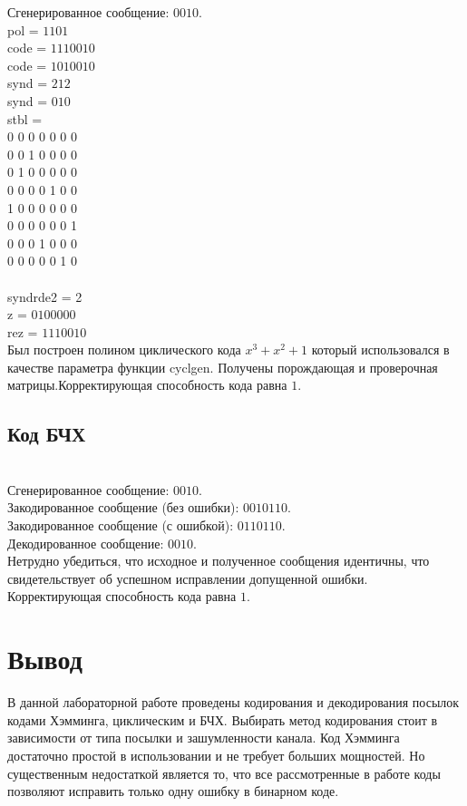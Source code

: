 \documentclass[a4paper]{article}
\begin{document}
Сгенерированное сообщение: $0 0 1 0$.\\
pol = $1 1 0 1$\\
code = $1 1 1 0 0 1 0$\\
code = $1 0 1 0 0 1 0$\\
synd = $2 1 2$\\
synd = $0 1 0$\\
stbl =\\
	 0     0     0     0     0     0     0\\
     0     0     1     0     0     0     0\\
     0     1     0     0     0     0     0\\
     0     0     0     0     1     0     0\\
     1     0     0     0     0     0     0\\
     0     0     0     0     0     0     1\\
     0     0     0     1     0     0     0\\
     0     0     0     0     0     1     0\\
\\
syndrde2 = 2\\
z = $0 1 0 0 0 0 0$\\
rez = $1 1 1 0 0 1 0$\\
Был построен полином циклического кода $x^3 + x^2 + 1$
который использовался в качестве параметра функции cyclgen. Получены порождающая и проверочная матрицы.Корректирующая способность кода равна $1$.
\subsection{Код БЧХ}
\\

Сгенерированное сообщение: $0 0 1 0$.\\
Закодированное сообщение (без ошибки): $0 0 1 0 1 1 0$.\\
Закодированное сообщение (с ошибкой): $0 1 1 0 1 1 0$.\\
Декодированное сообщение: $0 0 1 0$.\\
Нетрудно убедиться, что исходное и полученное сообщения идентичны, что свидетельствует об успешном исправлении допущенной ошибки.\\
Корректирующая способность кода равна $1$.
\section{Вывод}
В данной лабораторной работе проведены кодирования и декодирования посылок кодами Хэмминга, циклическим и БЧХ. Выбирать метод кодирования стоит в зависимости от типа посылки и зашумленности канала. Код Хэмминга достаточно простой в использовании и не требует больших мощностей. Но существенным недостаткой является то, что все рассмотренные в работе коды позволяют исправить только одну ошибку в бинарном коде.
\end{document}
